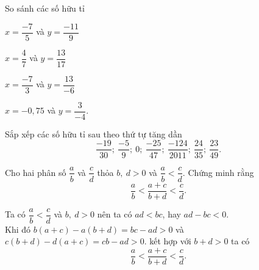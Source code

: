 \begin{bt}
	So sánh các số hữu tỉ
	\begin{listEX}[2]
		\item $x=\dfrac{-7}{5}$ và $y=\dfrac{-11}{9}$
		\item $x=\dfrac{4}{7}$ và $y=\dfrac{13}{17}$
		\item $x=\dfrac{-7}{3}$ và $y=\dfrac{13}{-6}$
		\item $x=-0,75$ và $y=\dfrac{3}{-4}$.
	\end{listEX}
\end{bt}
\begin{bt}
	Sắp xếp các số hữu tỉ sau theo thứ tự tăng dần
	$$\dfrac{-19}{30};\ \dfrac{-5}{9};\ 0;\ \dfrac{-25}{47};\ \dfrac{-124}{2011};\ \dfrac{24}{35};\ \dfrac{23}{49}. $$
\end{bt}
\begin{bt}
	Cho hai phân số $\dfrac{a}{b}$ và $\dfrac{c}{d}$ thỏa $b,\ d >0$ và $\dfrac{a}{b}<\dfrac{c}{d}$. Chứng minh rằng $$\dfrac{a}{b}<\dfrac{a+c}{b+d}<\dfrac{c}{d}.$$
		\loigiai
	{Ta có $\dfrac{a}{b}<\dfrac{c}{d}$ và $b,\ d>0$ nên ta có $ad<bc$, hay $ad-bc<0.$\\
		Khi đó $b(a+c)-a(b+d)=bc-ad>0$ và $c(b+d)-d(a+c)=cb-ad>0$. kết hợp với $b+d>0$ ta có $$\dfrac{a}{b}<\dfrac{a+c}{b+d}<\dfrac{c}{d}.$$
		
	}
\end{bt}
